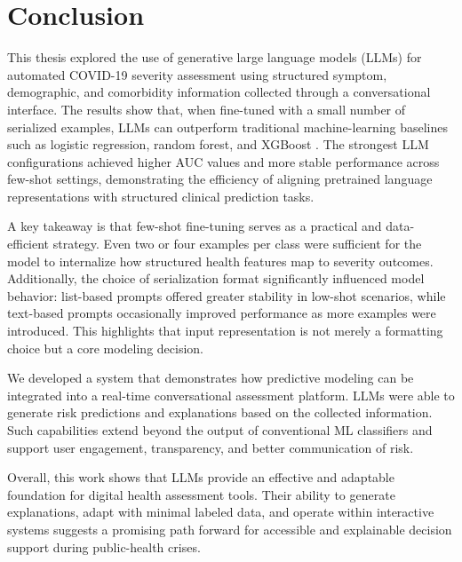 \section{Conclusion}

This thesis explored the use of generative large language models (LLMs) for automated COVID-19 severity assessment using structured symptom, demographic, and comorbidity information collected through a conversational interface. The results show that, when fine-tuned with a small number of serialized examples, LLMs can outperform traditional machine-learning baselines such as logistic regression, random forest, and XGBoost \cite{chen2016xgboost}. The strongest LLM configurations achieved higher AUC values and more stable performance across few-shot settings, demonstrating the efficiency of aligning pretrained language representations with structured clinical prediction tasks.

A key takeaway is that few-shot fine-tuning serves as a practical and data-efficient strategy. Even two or four examples per class were sufficient for the model to internalize how structured health features map to severity outcomes. Additionally, the choice of serialization format significantly influenced model behavior: list-based prompts offered greater stability in low-shot scenarios, while text-based prompts occasionally improved performance as more examples were introduced. This highlights that input representation is not merely a formatting choice but a core modeling decision.

We developed a system that demonstrates how predictive modeling can be integrated into a real-time conversational assessment platform. LLMs were able to generate risk predictions and explanations based on the collected information. Such capabilities extend beyond the output of conventional ML classifiers and support user engagement, transparency, and better communication of risk.

Overall, this work shows that LLMs provide an effective and adaptable foundation for digital health assessment tools. Their ability to generate explanations, adapt with minimal labeled data, and operate within interactive systems suggests a promising path forward for accessible and explainable decision support during public-health crises.
